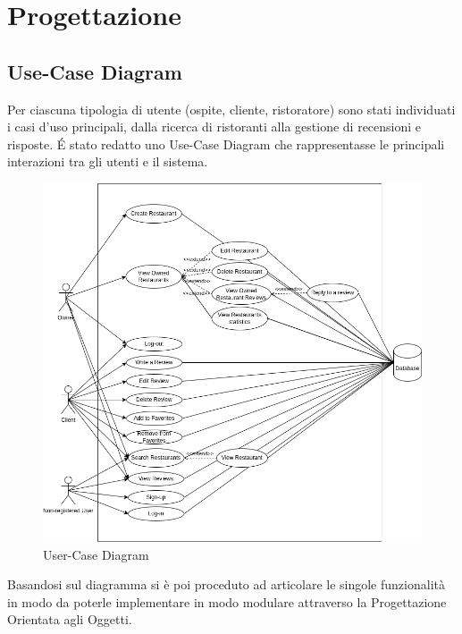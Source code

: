 \section{Progettazione}

\subsection{Use-Case Diagram}
Per ciascuna tipologia di utente (ospite, cliente, ristoratore) sono stati individuati 
i casi d'uso principali, dalla ricerca di ristoranti alla gestione 
di recensioni e risposte.
\'E stato redatto uno Use-Case Diagram che rappresentasse le 
principali interazioni tra gli utenti e il sistema.
\begin{figure}[H]
  \centering
  \includegraphics[width=\textwidth]{images/UML-Use-Case.png}
  \caption{User-Case Diagram}
  \label{fig:use-case-diagram}
\end{figure}
Basandosi sul diagramma si è poi proceduto ad articolare le 
singole funzionalità in modo da poterle implementare
in modo modulare attraverso la Progettazione Orientata agli Oggetti.

